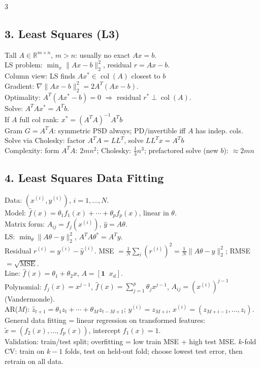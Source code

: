 \documentclass[8pt,landscape]{extarticle}
\newcommand{\R}{\mathbb{R}}
\newcommand{\1}{\mathbf{1}}
\newcommand{\0}{\mathbf{0}}
\begin{document}
\begin{multicols*}{3}
\subsection*{3. Least Squares (L3)}
Tall $A\in\R^{m\times n}$, $m>n$: usually no exact $Ax=b$. \\ 
LS problem: $\min_x \|Ax-b\|_2^2$, residual $r=Ax-b$. \\
Column view: LS finds $Ax^*\in\operatorname{col}(A)$ closest to $b$ \\
Gradient: $\nabla\|Ax-b\|_2^2=2A^T(Ax-b)$. \\
Optimality: $A^T(Ax^*-b)=0$ $\Rightarrow$ residual $r^*\perp\operatorname{col}(A)$. \\
Solve: $A^TAx^*=A^Tb$. \\
If $A$ full col rank: $x^*=(A^TA)^{-1}A^Tb$ \\
Gram $G=A^TA$: symmetric PSD always; PD/invertible iff $A$ has indep. cols. \\
Solve via Cholesky: factor $A^TA=LL^T$, solve $LL^Tx=A^Tb$ \\
Complexity: form $A^TA$: $2mn^2$; Cholesky: $\frac13 n^3$; prefactored solve (new $b$): $\approx 2mn$ \\

\subsection*{4. Least Squares Data Fitting}
Data: $(x^{(i)},y^{(i)})$, $i=1,\ldots,N$. \\
Model:  $\hat f(x)=\theta_1f_1(x)+\cdots+\theta_pf_p(x)$, linear in $\theta$. \\
Matrix form: $A_{ij}=f_j(x^{(i)})$, $\hat y=A\theta$. \\
LS: $\min_\theta \|A\theta-y\|_2^2$, $A^TA\theta^*=A^Ty$. \\
Residual $r^{(i)}=y^{(i)}-\hat y^{(i)}$.
MSE $=\frac1N\sum_i(r^{(i)})^2=\frac1N\|A\theta-y\|_2^2$; RMSE $=\sqrt{\mathrm{MSE}}$. \\
Line: $\hat f(x)=\theta_1+\theta_2x$, $A=[\mathbf1\;\;x_d]$. \\
Polynomial: $f_j(x)=x^{j-1}$, $\hat f(x)=\sum_{j=1}^p\theta_jx^{j-1}$,
$A_{ij}=(x^{(i)})^{j-1}$ (Vandermonde). \\
AR($M$): $\hat z_{t+1}=\theta_1z_t+\cdots+\theta_Mz_{t-M+1}$;
$y^{(i)}=z_{M+i}$, $x^{(i)}=(z_{M+i-1},\ldots,z_i)$. \\
General data fitting = linear regression on transformed features:
$\tilde x=(f_2(x),\ldots,f_p(x))$, intercept $f_1(x)=1$. \\
Validation: train/test split; overfitting = low train MSE + high test MSE.
$k$-fold CV: train on $k-1$ folds, test on held-out fold; choose lowest test error, then retrain on all data.


\end{multicols*}
\end{document}

